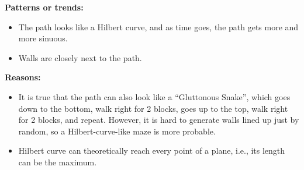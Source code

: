 \documentclass[letter]{article}
\begin{document}
\begin{enumerate}[resume]
\begin{enumerate}
\begin{enumerate}
\begin{figure}
				\end{figure}
				\textbf{Patterns or trends:} 
				\begin{itemize}
					\item {The path looks like a Hilbert curve, and as time goes, the path gets more and more sinuous.}
					\item {Walls are closely next to the path.}
				\end{itemize}
				
				\textbf{Reasons:} 
				\begin{itemize}
					\item {It is true that the path can also look like a “Gluttonous Snake”, which goes down to the bottom, walk right for 2 blocks, goes up to the top, walk right for 2 blocks, and repeat. However, it is hard to generate walls lined up just by random, so a Hilbert-curve-like maze is more probable.}
					\item {Hilbert curve can theoretically reach every point of a plane, i.e., its length can be the maximum.}
				\end{itemize}
				

\end{enumerate}
\end{enumerate}
\end{enumerate}
\end{document}
